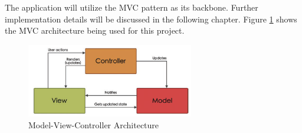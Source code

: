 The application will utilize the MVC pattern as its backbone. Further implementation details will be discussed in the following chapter. Figure \ref{fig:mvc} shows the MVC architecture being used for this project.

\begin{figure}[!ht]
    \centering
    \includegraphics[width=0.65\textwidth]{texs/Part2/chapter1/image/mvc.png}
    \caption{Model-View-Controller Architecture \cite[46]{Garca2023}}
    \label{fig:mvc}
\end{figure}
